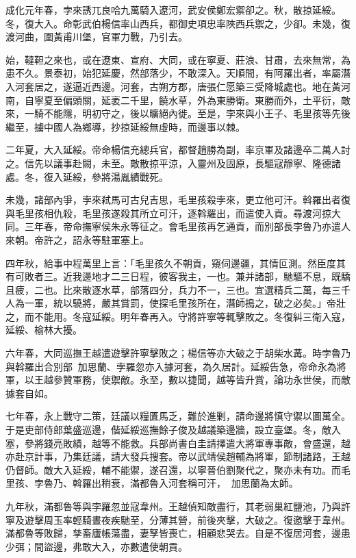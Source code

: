 \begin{pinyinscope}
成化元年春，孛來誘兀良哈九萬騎入遼河，武安侯鄭宏禦卻之。秋，散掠延綏。冬，復大入。命彰武伯楊信率山西兵，都御史項忠率陜西兵禦之，少卻。未幾，復渡河曲，圍黃甫川堡，官軍力戰，乃引去。

始，韃靼之來也，或在遼東、宣府、大同，或在寧夏、莊浪、甘肅，去來無常，為患不久。景泰初，始犯延慶，然部落少，不敢深入。天順間，有阿羅出者，率屬潛入河套居之，遂逼近西邊。河套，古朔方郡，唐張仁愿築三受降城處也。地在黃河南，自寧夏至偏頭關，延袤二千里，饒水草，外為東勝衛。東勝而外，土平衍，敵來，一騎不能隱，明初守之，後以曠絕內徙。至是，孛來與小王子、毛里孩等先後繼至，擄中國人為鄉導，抄掠延綏無虛時，而邊事以棘。

二年夏，大入延綏。帝命楊信充總兵官，都督趙勝為副，率京軍及諸邊卒二萬人討之。信先以議事赴闕，未至。敵散掠平涼，入靈州及固原，長驅寇靜寧、隆德諸處。冬，復入延綏，參將湯胤績戰死。

未幾，諸部內爭，孛來弒馬可古兒吉思，毛里孩殺孛來，更立他可汗。斡羅出者復與毛里孩相仇殺，毛里孩遂殺其所立可汗，逐斡羅出，而遣使入貢。尋渡河掠大同。三年春，帝命撫寧侯朱永等征之。會毛里孩再乞通貢，而別部長孛魯乃亦遣人來朝。帝許之，詔永等駐軍塞上。

四年秋，給事中程萬里上言：「毛里孩久不朝貢，窺伺邊疆，其情叵測。然臣度其有可敗者三。近我邊地才二三日程，彼客我主，一也。兼并諸部，馳驅不息，既驕且疲，二也。比來散逐水草，部落四分，兵力不一，三也。宜選精兵二萬，每三千人為一軍，統以驍將，嚴其賞罰，使探毛里孩所在，潛師搗之，破之必矣。」帝壯之，而不能用。冬寇延綏。明年春再入。守將許寧等輒擊敗之。冬復糾三衛入寇，延綏、榆林大擾。

六年春，大同巡撫王越遣遊擊許寧擊敗之；楊信等亦大破之于胡柴水冓。時孛魯乃與斡羅出合別部加思蘭、孛羅忽亦入據河套，為久居計。延綏告急，帝命永為將軍，以王越參贊軍務，使禦敵。永至，數以捷聞，越等皆升賞，論功永世侯，而敵據套自如。

七年春，永上戰守二策，廷議以糧匱馬乏，難於進剿，請命邊將慎守禦以圖萬全。于是吏部侍郎葉盛巡邊，偕延綏巡撫餘子俊及越議築邊牆，設立臺堡。冬，敵入塞，參將錢亮敗績，越等不能救。兵部尚書白圭請擇遣大將軍專事敵，會盛還，越亦赴京計事，乃集廷議，請大發兵搜套。帝以武靖侯趙輔為將軍，節制諸路，王越仍督師。敵大入延綏，輔不能禦，遂召還，以寧晉伯劉聚代之，聚亦未有功。而毛里孩、孛魯乃、斡羅出稍衰，滿都魯入河套稱可汗，加思蘭為太師。

九年秋，滿都魯等與孛羅忽並寇韋州。王越偵知敵盡行，其老弱巢紅鹽池，乃與許寧及遊擊周玉率輕騎晝夜疾馳至，分薄其營，前後夾擊，大破之。復邀擊于韋州。滿都魯等敗歸，孳畜廬帳蕩盡，妻孥皆喪亡，相顧悲哭去。自是不復居河套，邊患少弭；間盜邊，弗敢大入，亦數遣使朝貢。


\end{pinyinscope}
